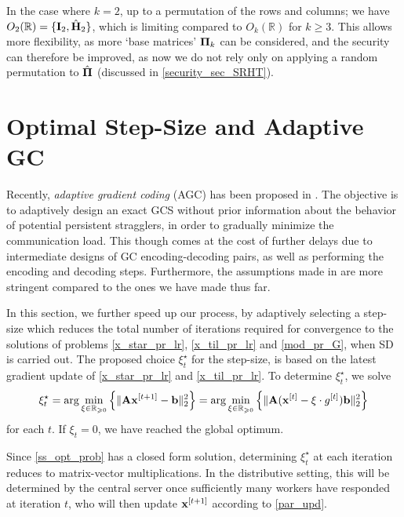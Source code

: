 \documentclass[journal,letterpaper,onecolumn,twoside,nofonttune]{IEEEtran}
\newcommand{\xb}{\bold{x}}
\newcommand{\Pibold}{\bold{\Pi}}
\newcommand{\Pibh}{\hat{\Pibold}}
\newcommand{\R}{\mathbb{R}}
\newcommand{\Ab}{\bold{A}}
\newcommand{\bb}{\bold{b}}
\newcommand{\Ib}{\bold{I}}
\newcommand{\Hbh}{\hat{\bold{H}}}
\begin{document}
In the case where $k=2$, up to a permutation of the rows and columns; we have $O_2(\R)=\{\Ib_2,\Hbh_2\}$, which is limiting compared to $O_k(\R)$ for $k\geqslant3$. This allows more flexibility, as more `base matrices' $\Pibold_k$ can be considered, and the security can therefore be improved, as now we do not rely only on applying a random permutation to $\Pibh$ (discussed in \ref{security_sec_SRHT}).

\section{Optimal Step-Size and Adaptive GC}
\label{opt_ss_sec}

Recently, \textit{adaptive gradient coding} (AGC) has been proposed in \cite{CT22}. The objective is to adaptively design an exact GCS without prior information about the behavior of potential persistent stragglers, in order to gradually minimize the communication load. This though comes at the cost of further delays due to intermediate designs of GC encoding-decoding pairs, as well as performing the encoding and decoding steps. Furthermore, the assumptions made in \cite{CT22} are more stringent compared to the ones we have made thus far.

In this section, we further speed up our process, by adaptively selecting a step-size which reduces the total number of iterations required for convergence to the solutions of problems \eqref{x_star_pr_lr}, \eqref{x_til_pr_lr} and \eqref{mod_pr_G}, when SD is carried out. The proposed choice $\xi_t^\star$ for the step-size, is based on the latest gradient update of \eqref{x_star_pr_lr} and \eqref{x_til_pr_lr}. To determine $\xi_t^\star$, we solve 
\begin{equation}
\label{ss_opt_prob}  %
  \xi_t^{\star} = \arg\min_{\xi\in\R_{\geqslant0}}\Big\{\|\Ab\xb^{[t+1]}-\bb\|_2^2\Big\} = \arg\min_{\xi\in\R_{\geqslant0}}\Big\{\|\Ab(\xb^{[t]}-\xi\cdot g^{[t]})\bb\|_2^2\Big\}
\end{equation}
for each $t$. If $\xi_t=0$, we have reached the global optimum.

Since \eqref{ss_opt_prob} has a closed form solution, determining $\xi^{\star}_t$ at each iteration reduces to matrix-vector multiplications. In the distributive setting, this will be determined by the central server once sufficiently many workers have responded at iteration $t$, who will then update $\xb^{[t+1]}$ according to \eqref{par_upd}.
\end{document}
